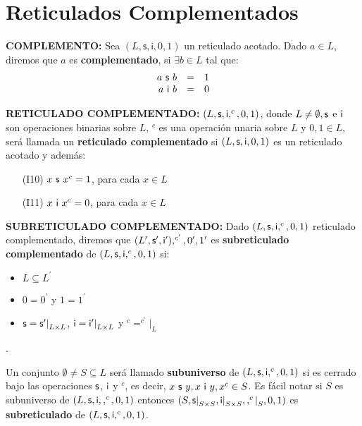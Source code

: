 \section{Reticulados Complementados}

  \PN \textbf{COMPLEMENTO:} Sea $(L,\mathsf{s},\mathsf{i},0,1)$ un reticulado acotado. Dado $a \in L$, diremos que
  $a$ es \textbf{complementado}, si $\exists b \in L$ tal que:
  \[
    \begin{array}{rcl}
      a \ \mathsf{s} \ b &=& 1 \\
      a \ \mathsf{i} \ b &=& 0
    \end{array}
  \]

  \PN \textbf{RETICULADO COMPLEMENTADO:} $(L, \mathsf{s}, \mathsf{i}, ^{c}, 0, 1)$, donde $L \neq \emptyset, \mathsf{s}$ e $\mathsf{i}$ son
  operaciones binarias sobre $L$, $^{c}$ es una operación unaria sobre $L$ y $0, 1 \in L$, será llamada un
  \textbf{reticulado complementado} si $(L, \mathsf{s}, \mathsf{i}, 0, 1)$ es un reticulado acotado y además:
  \begin{enumerate}
    \item[(I10)] $x \ \mathsf{s} \ x^{c} = 1$, para cada $x \in L$
    \item[(I11)] $x \ \mathsf{i} \ x^{c} = 0$, para cada $x \in L$
  \end{enumerate}

  \vspace{3mm}
  \PN \textbf{SUBRETICULADO COMPLEMENTADO:} Dado $(L, \mathsf{s}, \mathsf{i}, ^{c}, 0, 1)$ reticulado complementado, diremos que
  $(L^{\prime}, \mathsf{s}^{\prime}, \mathsf{i}^{\prime}), ^{c^{\prime}}, 0^{\prime}, 1^{\prime}$ es \textbf{subreticulado
  complementado} de $(L, \mathsf{s}, \mathsf{i}, ^{c}, 0, 1)$ si:
  \begin{itemize}
    \item $L \subseteq L^{\prime}$
    \item $0 = 0^{\prime}$ y $1 = 1^{\prime}$
    \item $\mathsf{s} = \mathsf{s}^{\prime}\mathrm{\mid}_{L \times L}$, $\mathsf{i} = \mathsf{i}^{\prime}\mathrm{\mid}_{L \times L}$ y
      $^{c} = ^{c^{\prime}}\mathrm{\mid}_{L}$
  \end{itemize}.

  \PN Un conjunto $\emptyset \neq S \subseteq L$ será llamado \textbf{subuniverso} de $(L, \mathsf{s}, \mathsf{i}, ^{c}, 0, 1)$ si es
  cerrado bajo las operaciones $\mathsf{s}$, $\mathsf{i}$ y $^{c}$, es decir, $x \ \mathsf{s} \ y, x \ \mathsf{i} \ y, x^{c} \in S$. Es fácil notar
  si $S$ es subuniverso de $(L, \mathsf{s}, \mathsf{i}, , ^{c}, 0, 1)$ entonces $(S, \mathsf{s}\mathrm{\mid}_{S \times S}, \mathsf{i}\mathrm{\mid}_{
  S \times S}, , ^{c}\mathrm{\mid}_{S}, 0, 1)$ es \textbf{subreticulado} de $(L, \mathsf{s}, \mathsf{i}, ^{c}, 0, 1)$.

